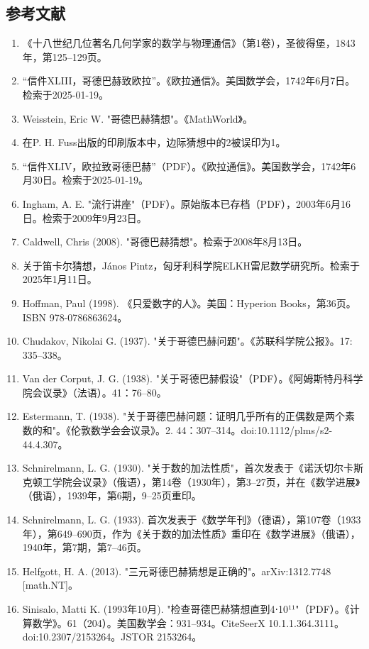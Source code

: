 \subsection{参考文献}  
\begin{enumerate}
\item 《十八世纪几位著名几何学家的数学与物理通信》（第1卷），圣彼得堡，1843年，第125–129页。  
\item “信件XLIII，哥德巴赫致欧拉”。《欧拉通信》。美国数学会，1742年6月7日。检索于2025-01-19。  
\item Weisstein, Eric W. "哥德巴赫猜想"。《MathWorld》。  
\item 在P. H. Fuss出版的印刷版本中，边际猜想中的2被误印为1。  
\item “信件XLIV，欧拉致哥德巴赫”（PDF）。《欧拉通信》。美国数学会，1742年6月30日。检索于2025-01-19。  
\item Ingham, A. E. "流行讲座"（PDF）。原始版本已存档（PDF），2003年6月16日。检索于2009年9月23日。  
\item Caldwell, Chris (2008). "哥德巴赫猜想"。检索于2008年8月13日。  
\item 关于笛卡尔猜想，János Pintz，匈牙利科学院ELKH雷尼数学研究所。检索于2025年1月11日。  
\item Hoffman, Paul (1998). 《只爱数字的人》。美国：Hyperion Books，第36页。ISBN 978-0786863624。  
\item Chudakov, Nikolai G. (1937). "关于哥德巴赫问题"。《苏联科学院公报》。17: 335–338。
\item Van der Corput, J. G. (1938). "关于哥德巴赫假设"（PDF）。《阿姆斯特丹科学院会议录》（法语）。41：76–80。  
\item Estermann, T. (1938). "关于哥德巴赫问题：证明几乎所有的正偶数是两个素数的和"。《伦敦数学会会议录》。2. 44：307–314。doi:10.1112/plms/s2-44.4.307。  
\item Schnirelmann, L. G. (1930). "关于数的加法性质"，首次发表于《诺沃切尔卡斯克顿工学院会议录》（俄语），第14卷（1930年），第3–27页，并在《数学进展》（俄语），1939年，第6期，9–25页重印。  
\item Schnirelmann, L. G. (1933). 首次发表于《数学年刊》（德语），第107卷（1933年），第649–690页，作为《关于数的加法性质》重印在《数学进展》（俄语），1940年，第7期，第7–46页。  
\item Helfgott, H. A. (2013). "三元哥德巴赫猜想是正确的"。arXiv:1312.7748 [math.NT]。  
\item Sinisalo, Matti K. (1993年10月). "检查哥德巴赫猜想直到4⋅10¹¹"（PDF）。《计算数学》。61（204）。美国数学会：931–934。CiteSeerX 10.1.1.364.3111。doi:10.2307/2153264。JSTOR 2153264。  

\end{enumerate}
